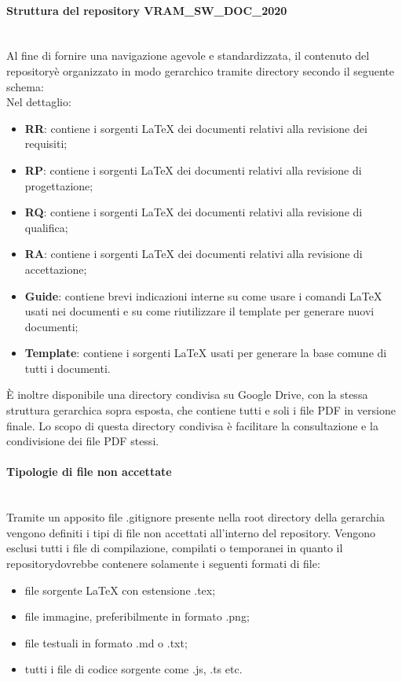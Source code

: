 		\paragraph*{Struttura del repository VRAM\_SW\_DOC\_2020} \mbox{}\\ [1mm]
		Al fine di fornire una navigazione agevole e standardizzata, il contenuto del repository\glosp è organizzato in modo gerarchico tramite directory secondo il seguente schema:
		\newline
		\mbox{}\\ %
		Nel dettaglio:
		\begin{itemize}
			\item \textbf{RR}: contiene i sorgenti \LaTeX \xspace dei documenti relativi alla revisione dei requisiti;
			\item \textbf{RP}: contiene i sorgenti \LaTeX \xspace dei documenti relativi alla revisione di progettazione\glo;
			\item \textbf{RQ}: contiene i sorgenti \LaTeX \xspace dei documenti relativi alla revisione di qualifica;
			\item \textbf{RA}: contiene i sorgenti \LaTeX \xspace dei documenti relativi alla revisione di accettazione; 
			\item \textbf{Guide}: contiene brevi indicazioni interne su come usare i comandi \LaTeX \xspace usati nei documenti e su come riutilizzare il template per generare nuovi documenti;
			\item \textbf{Template}: contiene i sorgenti \LaTeX \xspace usati per generare la base comune di tutti i documenti.
		\end{itemize}
		È inoltre disponibile una directory condivisa su Google Drive, con la stessa struttura gerarchica sopra esposta, che contiene tutti e soli i file PDF in versione finale. Lo scopo di questa directory condivisa è facilitare la consultazione e la condivisione dei file PDF stessi.
		
	\paragraph{Tipologie di file non accettate}\mbox{}\\ [1mm]
		Tramite un apposito file .gitignore presente nella root directory della gerarchia vengono definiti i tipi di file non accettati all'interno del repository\glo. Vengono esclusi tutti i file di compilazione, compilati o temporanei in quanto il repository\glosp dovrebbe contenere solamente i seguenti formati di file:
		\begin{itemize}
			\item file sorgente \LaTeX \xspace con estensione .tex;
			\item file immagine, preferibilmente in formato .png;
			\item file testuali in formato .md o .txt;
			\item tutti i file di codice sorgente come .js, .ts etc.		
		\end{itemize}
